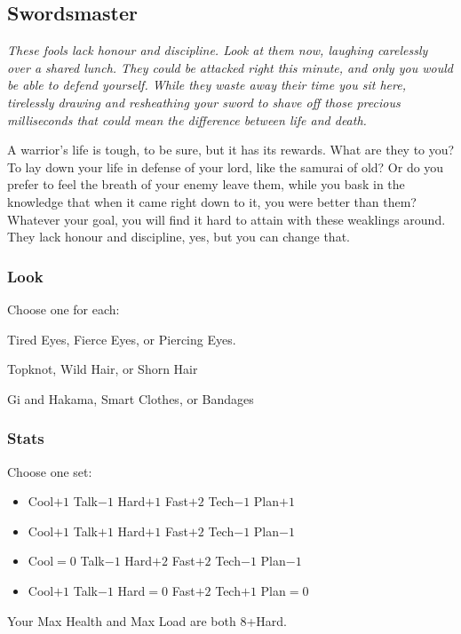 \subsection{Swordsmaster}
{\itshape These fools lack honour and discipline. Look at them now,
  laughing carelessly over a shared lunch. They could be attacked
  right this minute, and only you would be able to defend
  yourself. While they waste away their time you sit here, tirelessly
  drawing and resheathing your sword to shave off those precious
  milliseconds that could mean the difference between life and death.

A warrior's life is tough, to be sure, but it has its rewards. What
are they to you? To lay down your life in defense of your lord, like
the samurai of old? Or do you prefer to feel the breath of your enemy
leave them, while you bask in the knowledge that when it came right
down to it, you were better than them? Whatever your goal, you will
find it hard to attain with these weaklings around. They lack honour
and discipline, yes, but you can change that.}

\subsubsection{Look}

Choose one for each:

Tired Eyes, Fierce Eyes, or Piercing Eyes.

Topknot, Wild Hair, or Shorn Hair

Gi and Hakama, Smart Clothes, or Bandages

\subsubsection{Stats}
Choose one set:
\begin{itemize}
\setlength\itemsep{0em}
\item Cool$+1$ Talk$-1$ Hard$+1$ Fast$+2$ Tech$-1$ Plan$+1$
\item Cool$+1$ Talk$+1$ Hard$+1$ Fast$+2$ Tech$-1$ Plan$-1$
\item Cool${=}0$ Talk$-1$ Hard$+2$ Fast$+2$ Tech$-1$ Plan$-1$
\item Cool$+1$ Talk$-1$ Hard${=}0$ Fast$+2$ Tech$+1$ Plan${=}0$
\end{itemize}

Your Max Health and Max Load are both 8+Hard.

